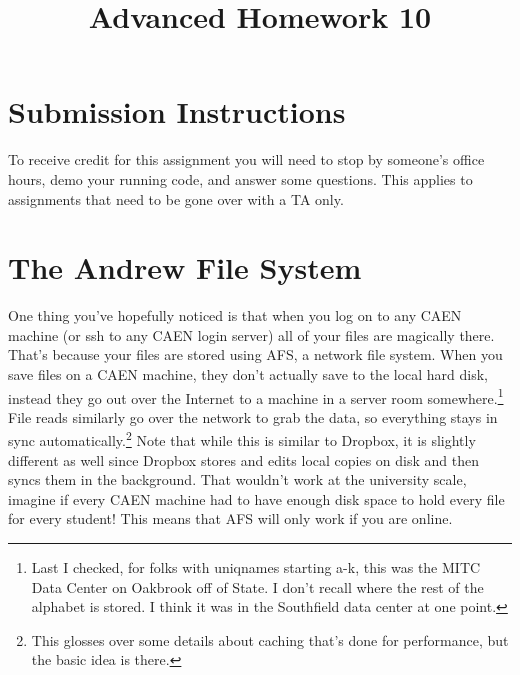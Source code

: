 \documentclass{article}
\begin{document}
\fancyfoot[C]{\color{gray} \thepage~/~\pageref*{LastPage}}
\pagestyle{fancyplain}

\title{\textbf{Advanced Homework 10\\}}
\author{\textbf{\color{red}{Due: Wednesday, November 22nd, 11:59PM (Hard Deadline)}}}
\date{}
\maketitle


\section*{Submission Instructions}
To receive credit for this assignment you will need to stop by someone's
office hours, demo your running code, and answer some questions. \textbf{\color{red}{Make sure
to check the office hour schedule as the real due date is at the last office
hours before the date listed above.}} This applies to assignments that need to be gone over with a TA only.


\section*{The Andrew File System}

One thing you've hopefully noticed is that when you log on to any CAEN machine
(or ssh to any CAEN login server) all of your files are magically there.
That's because your files are stored using AFS, a network file system. When
you save files on a CAEN machine, they don't actually save to the local hard
disk, instead they go out over the Internet to a machine in a server room
somewhere.\footnote{Last I checked, for folks with uniqnames starting a-k,
this was the MITC Data Center on Oakbrook off of State. I don't recall where
the rest of the alphabet is stored. I think it was in the Southfield data
center at one point.} File reads similarly go over the network to grab the
data, so everything stays in sync automatically.\footnote{This glosses over
  some details about caching that's done for performance, but the basic idea
  is there.} Note that while this is similar to Dropbox, it is slightly
different as well since Dropbox stores and edits local copies on disk and then
syncs them in the background. That wouldn't work at the university scale,
imagine if every CAEN machine had to have enough disk space to hold every file
for every student! This means that AFS will only work if you are online.
\end{document}
